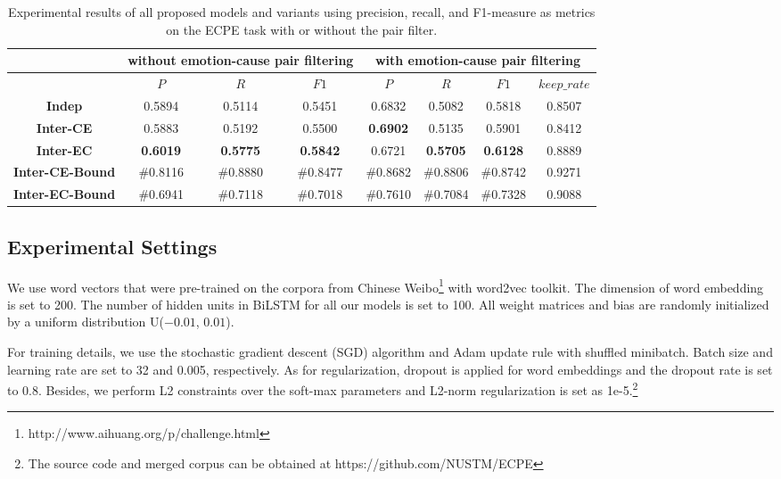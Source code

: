 \documentclass[11pt,a4paper]{article}
\begin{document}
\begin{table*}
	\small
	\centering
	
	\begin{tabular} {c|c|c|c|c|c|c|c}
		\hline
		  & \multicolumn{3}{|c|}{without emotion-cause pair filtering} & \multicolumn{4}{|c}{with emotion-cause pair filtering}\\
		\hline
		& $P$ & $R$ & $F1$ & $P$ & $R$ & $F1$ & $keep\_rate$ \\
		\hline
		\textbf{Indep} & 0.5894 & 0.5114 & 0.5451 & 0.6832 & 0.5082 & 0.5818 & 0.8507\\
		\textbf{Inter-CE} & 0.5883 & 0.5192 & 0.5500 & \textbf{0.6902} & 0.5135 & 0.5901 & 0.8412\\
		\textbf{Inter-EC} & \textbf{0.6019} & \textbf{0.5775} & \textbf{0.5842} & 0.6721 & \textbf{0.5705} & \textbf{0.6128} & 0.8889\\

		\textbf{Inter-CE-Bound} & \#0.8116 & \#0.8880  & \#0.8477 & \#0.8682 & \#0.8806 & \#0.8742 & 0.9271\\
		\textbf{Inter-EC-Bound} & \#0.6941 & \#0.7118 & \#0.7018 & \#0.7610 & \#0.7084 & \#0.7328 & 0.9088\\
		
		\hline
	\end{tabular}
	\caption{Experimental results of all proposed models and variants using precision, recall, and F1-measure as metrics on the ECPE task with or without the pair filter.}
	\label{TableFour}
\end{table*}

\subsection{Experimental Settings}
We use word vectors that were pre-trained on the corpora from Chinese Weibo\footnote{http://www.aihuang.org/p/challenge.html} with word2vec \cite{mikolov2013distributed} toolkit. The dimension of word embedding is set to 200. The number of hidden units in BiLSTM for all our models is set to 100. All weight matrices and bias are randomly initialized by a uniform distribution U($ -0.01 $, $ 0.01 $).

For training details, we use the stochastic gradient descent (SGD) algorithm and Adam update rule with shuffled minibatch. Batch size and learning rate are set to 32 and 0.005, respectively. As for regularization, dropout is applied for word embeddings and the dropout rate is set to 0.8. Besides, we perform L2 constraints over the soft-max parameters and L2-norm regularization is set as 1e-5.\footnote{The source code and merged corpus can be obtained at https://github.com/NUSTM/ECPE}
\end{document}
